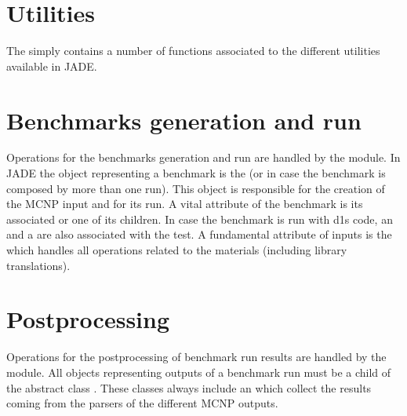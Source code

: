 \documentclass[letterpaper,10pt,english]{sphinxmanual}
\begin{document}
\section{Utilities}
\label{\detokenize{api/general:utilities}}
\sphinxAtStartPar
The  simply contains a number of functions associated to the
different utilities available in JADE.


\nopagebreak


\sphinxAtStartPar
{\hyperref[\detokenize{usage/utilities:uty}]{}}




\section{Benchmarks generation and run}
\label{\detokenize{api/general:benchmarks-generation-and-run}}
\sphinxAtStartPar
Operations for the benchmarks generation and run are handled by the 
module.
In JADE the object representing a benchmark is the {\hyperref[\detokenize{api/inputgeneration:testob}]{}} (or {\hyperref[\detokenize{api/inputgeneration:multitestob}]{}}
in case the benchmark is composed by more than one run). This object is responsible
for the creation of the MCNP input and for its run. A vital attribute of the benchmark
is its associated {\hyperref[\detokenize{api/inputgeneration:inputob}]{}} or one of its children. In case the benchmark is run
with d1s code, an {\hyperref[\detokenize{api/inputgeneration:irradfileob}]{}} and a {\hyperref[\detokenize{api/inputgeneration:reacfileob}]{}} are also associated with the
test. A fundamental attribute of inputs is the {\hyperref[\detokenize{api/inputgeneration:matcardob}]{}} which handles all operations
related to the materials (including library translations).


\section{Post\sphinxhyphen{}processing}
\label{\detokenize{api/general:post-processing}}
\sphinxAtStartPar
Operations for the post\sphinxhyphen{}processing of benchmark run results are handled by the
 module.
All objects representing outputs of a benchmark run must be a child of the abstract class
{\hyperref[\detokenize{api/postprocessing:abstractoutputob}]{}}. These classes always include an {\hyperref[\detokenize{api/postprocessing:mcnpoutputob}]{}} which collect
the results coming from the parsers of the different MCNP outputs.
\end{document}
